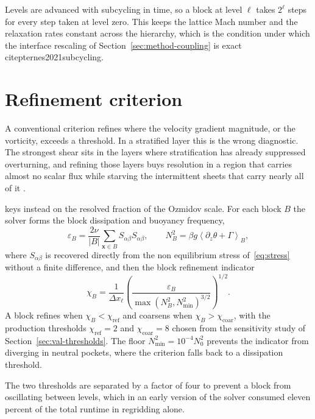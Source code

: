 Levels are advanced with subcycling in time, so a block at level $\ell$ takes
$2^{\ell}$ steps for every step taken at level zero. This keeps the lattice
Mach number and the relaxation rates constant across the hierarchy, which is the
condition under which the interface rescaling of
Section~\ref{sec:method-coupling} is exact \\citep{ternes2021subcycling}.

\section{Refinement criterion}
\label{sec:method-criterion}

A conventional criterion refines where the velocity gradient magnitude, or the
vorticity, exceeds a threshold. In a stratified layer this is the wrong
diagnostic. The strongest shear sits in the layers where stratification has
already suppressed overturning, and refining those layers buys resolution in a
region that carries almost no scalar flux while starving the intermittent sheets
that carry nearly all of it \citep{vestergaard2022ozmidov}.

\solver{} keys instead on the resolved fraction of the Ozmidov scale. For each
block $B$ the solver forms the block dissipation and buoyancy frequency,
\begin{equation}
  \varepsilon_B = \frac{2\nu}{|B|} \sum_{\mathbf{x} \in B} S_{\alpha\beta} S_{\alpha\beta},
  \qquad
  N_B^{2} = \beta g \left\langle \partial_z \theta + \Gamma \right\rangle_B,
  \label{eq:block-diagnostics}
\end{equation}
where $S_{\alpha\beta}$ is recovered directly from the non equilibrium stress
of~\eqref{eq:stress} without a finite difference, and then the block refinement
indicator
\begin{equation}
  \chi_B = \frac{1}{\Delta x_\ell}
    \left( \frac{\varepsilon_B}{\max(N_B^{2}, N_{\min}^{2})^{3/2}} \right)^{1/2}.
  \label{eq:indicator}
\end{equation}
A block refines when $\chi_B < \chi_{\mathrm{ref}}$ and coarsens when
$\chi_B > \chi_{\mathrm{coar}}$, with the production thresholds
$\chi_{\mathrm{ref}} = 2$ and $\chi_{\mathrm{coar}} = 8$ chosen from the
sensitivity study of Section~\ref{sec:val-thresholds}. The floor
$N_{\min}^{2} = 10^{-4} N_0^{2}$ prevents the indicator from diverging in
neutral pockets, where the criterion falls back to a dissipation threshold.

The two thresholds are separated by a factor of four to prevent a block from
oscillating between levels, which in an early version of the solver consumed
eleven percent of the total runtime in regridding alone.

